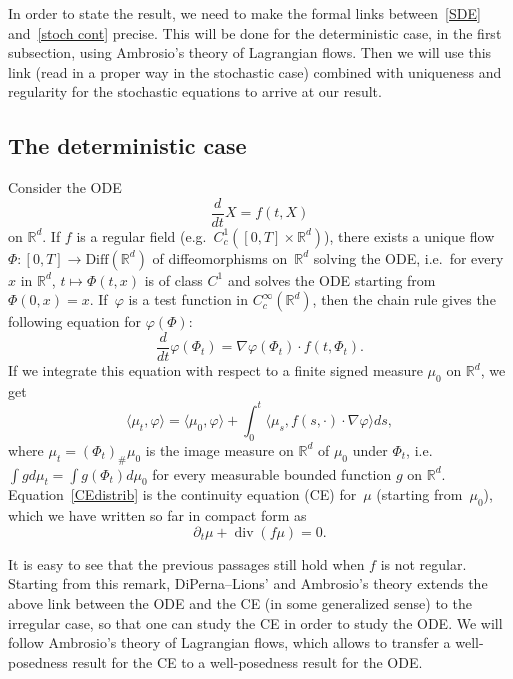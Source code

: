 \documentclass[a4paper,10pt]{article}
\newcommand\1{\mathbbm{1}}
\newcommand{\mr}{\mathbb{R}}
\newcommand{\lan}{\langle}
\newcommand{\ran}{\rangle}
\DeclareMathOperator{\diverg}{div}
\numberwithin{equation}{section}
\begin{document}
In order to state the result, we need to make the formal links between~\eqref{SDE} and~\eqref{stoch cont} precise. This will be done for the deterministic case, in the first subsection, using Ambrosio's theory of Lagrangian flows. Then we will use this link (read in a proper way in the stochastic case) combined with uniqueness and regularity for the stochastic equations to arrive at our result. 

\subsection{The deterministic case}\label{deterministic case subsection}

Consider the ODE
\begin{equation}
\frac{d}{dt}X =f(t,X) \label{ODEf}
\end{equation}
on $\mr^d$. If $f$ is a regular field (e.g.~$C^1_c([0,T]\times\mr^d)$), there exists a unique flow~$\Phi \colon [0,T] \to \mathrm{Diff}(\mr^d)$ of diffeomorphisms on~$\mr^d$ solving the ODE, i.e.~for every~$x$ in $\mr^d$, $t\mapsto\Phi(t,x)$ is of class $C^1$ and solves the ODE starting from $\Phi(0,x)=x$. If~$\varphi$ is a test function in $C^\infty_c(\mr^d)$, then the chain rule gives the following equation for $\varphi(\Phi)$:
\begin{equation*}
\frac{d}{dt}\varphi(\Phi_t)=\nabla\varphi(\Phi_t)\cdot f(t,\Phi_t) .
\end{equation*}
If we integrate this equation with respect to a finite signed measure $\mu_0$ on $\mr^d$, we get
\begin{equation}\label{CEdistrib}
\lan\mu_t,\varphi\ran=\lan\mu_0,\varphi\ran+\int^t_0\lan\mu_s,f(s,\cdot)\cdot\nabla\varphi\ran ds ,
\end{equation}
where $\mu_t=(\Phi_t)_\#\mu_0$ is the image measure on $\mr^d$ of $\mu_0$ under $\Phi_t$, i.e.\ $\int gd\mu_t=\int g(\Phi_t)d\mu_0$ for every measurable bounded function $g$ on $\mr^d$. Equation~\eqref{CEdistrib} is the continuity equation (CE) for~$\mu$ (starting from~$\mu_0$), which we have written so far in compact form as
\begin{equation}\label{CE}\tag{CE}
\partial_t\mu+\diverg(f\mu)=0 .
\end{equation}

It is easy to see that the previous passages still hold when $f$ is not regular. Starting from this remark, DiPerna--Lions' and Ambrosio's theory extends the above link between the ODE and the CE (in some generalized sense) to the irregular case, so that one can study the CE in order to study the ODE. We will follow Ambrosio's theory of Lagrangian flows, which allows to transfer a well-posedness result for the CE to a well-posedness result for the ODE.
\end{document}
